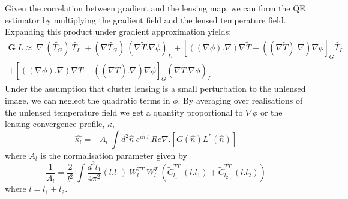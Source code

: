  Given the correlation between gradient and the lensing map, we can form the QE estimator by multiplying the gradient field and the lensed temperature field.
 Expanding this product under gradient approximation yields:
 \begin{equation}
 \begin{split}
 \textbf{G} \: L \approx \: \nabla \: (\widetilde{T_{G}}) \: \widetilde{T_{L}} \: + (\nabla \widetilde{T_{G}}) \: (\nabla \widetilde{T}.\nabla \phi)_{L}   + [((\nabla \phi). \nabla) \nabla\widetilde{T} + ((\nabla \widetilde{T}). \nabla) \nabla{\phi}]_{G} \widetilde{T_{L}} \\
 + [((\nabla \phi). \nabla) \nabla\widetilde{T} + ((\nabla \widetilde{T}). \nabla) \nabla{\phi}]_{G} (\nabla \widetilde{T} .\nabla \phi)_{L}%
\end{split}
 \end{equation}
  Under the assumption that cluster lensing is a small perturbation to the unlensed image, we can neglect the quadratic terms in $\phi$.
  By averaging over realisations of the unlensed temperature field we get a quantity proportional to $\nabla \phi$ or the lensing convergence profile, $\kappa$,
 \begin{equation}
 \hat{\kappa_{l}} = -A_{l} \: \int d^{2}\hat{n} \: e^{i\hat{n}.l} \:Re{\nabla .[G(\hat{n}) L^{*}(\hat{n})]}
 \label{mqe_convergence_eqn}
 \end{equation}
 where $A_{l}$ is the normalisation parameter given by
 \begin{equation}
 \frac{1}{A_{l}} = \frac{2}{l^{2}} \: \int \frac{d^{2}l_{1}}{4\pi^{2}} (l.l_{1}) \: W^{TT}_{l} \: W^{T}_{l} \: (\tilde{C}^{TT}_{l_{1}}\: (l.l_{1}) + \tilde{C}^{TT}_{l_{2}}\: (l.l_{2}))
 \end{equation}
 where $l = l_{1}  + l_{2}$. 
